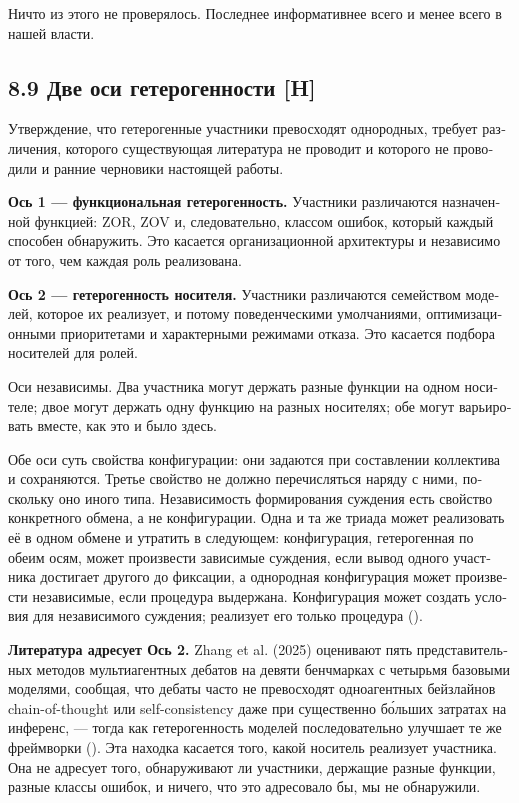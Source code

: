 \begin{russian}
Ничто из этого не проверялось. Последнее информативнее всего и менее всего в нашей власти.


\subsection*{8.9 Две оси гетерогенности \textbf{[H]}}
\label{sec:ru:8.9}

Утверждение, что гетерогенные участники превосходят однородных, требует различения, которого существующая литература не проводит и которого не проводили и ранние черновики настоящей работы.

\textbf{Ось 1 — функциональная гетерогенность.} Участники различаются назначенной функцией: ZOR, ZOV и, следовательно, классом ошибок, который каждый способен обнаружить. Это касается организационной архитектуры и независимо от того, чем каждая роль реализована.

\textbf{Ось 2 — гетерогенность носителя.} Участники различаются семейством моделей, которое их реализует, и потому поведенческими умолчаниями, оптимизационными приоритетами и характерными режимами отказа. Это касается подбора носителей для ролей.

Оси независимы. Два участника могут держать разные функции на одном носителе; двое могут держать одну функцию на разных носителях; обе могут варьировать вместе, как это и было здесь.

Обе оси суть свойства конфигурации: они задаются при составлении коллектива и сохраняются. Третье свойство не должно перечисляться наряду с ними, поскольку оно иного типа. Независимость формирования суждения есть свойство конкретного обмена, а не конфигурации. Одна и та же триада может реализовать её в одном обмене и утратить в следующем: конфигурация, гетерогенная по обеим осям, может произвести зависимые суждения, если вывод одного участника достигает другого до фиксации, а однородная конфигурация может произвести независимые, если процедура выдержана. Конфигурация может создать условия для независимого суждения; реализует его только процедура ().

\textbf{Литература адресует Ось 2.} Zhang et al. (2025) оценивают пять представительных методов мультиагентных дебатов на девяти бенчмарках с четырьмя базовыми моделями, сообщая, что дебаты часто не превосходят одноагентных бейзлайнов chain-of-thought или self-consistency даже при существенно бо́льших затратах на инференс, — тогда как гетерогенность моделей последовательно улучшает те же фреймворки (). Эта находка касается того, какой носитель реализует участника. Она не адресует того, обнаруживают ли участники, держащие разные функции, разные классы ошибок, и ничего, что это адресовало бы, мы не обнаружили.


\end{russian}
